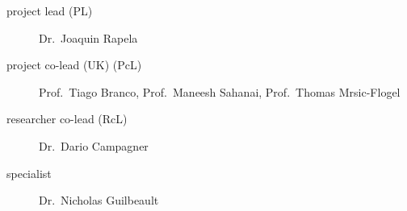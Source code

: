 
\begin{description}
    \item[project lead (PL)] Dr.~Joaquin Rapela
    \item[project co-lead (UK) (PcL)] Prof.~Tiago Branco, Prof.~Maneesh Sahanai, Prof.~Thomas Mrsic-Flogel
    \item[researcher co-lead (RcL)] Dr.~Dario Campagner
    \item[specialist] Dr.~Nicholas Guilbeault
\end{description}
